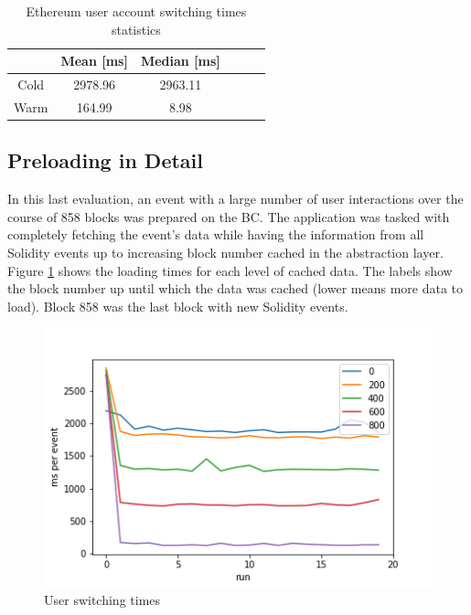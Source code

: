\begin{table}[ht]
\centering
\begin{tabular}{|c|c|c|c|c|c|}
\hline
 & \textbf{Mean [ms]} & \textbf{Median [ms]} \\ \hline
Cold & 2978.96            & 2963.11     \\ \hline
Warm & 164.99           &  8.98      \\ \hline
\end{tabular}
\caption{Ethereum user account switching times statistics}
\label{tab:baseline3}
\end{table}

\subsection{Preloading in Detail}\label{section:eval-preloading}

In this last evaluation, an event with a large number of user interactions over the course of 858 blocks was prepared on the BC. The application was tasked with completely fetching the event's data while having the information from all Solidity events up to increasing block number cached in the abstraction layer. Figure \ref{img:caching} shows the loading times for each level of cached data. The labels show the block number up until which the data was cached (lower means more data to load). Block 858 was the last block with new Solidity events. 

\begin{figure}[H]
    \centering
    \includegraphics[width=14cm]{images/plot4.png}
    \caption{User switching times}
    \label{img:caching}
\end{figure}

